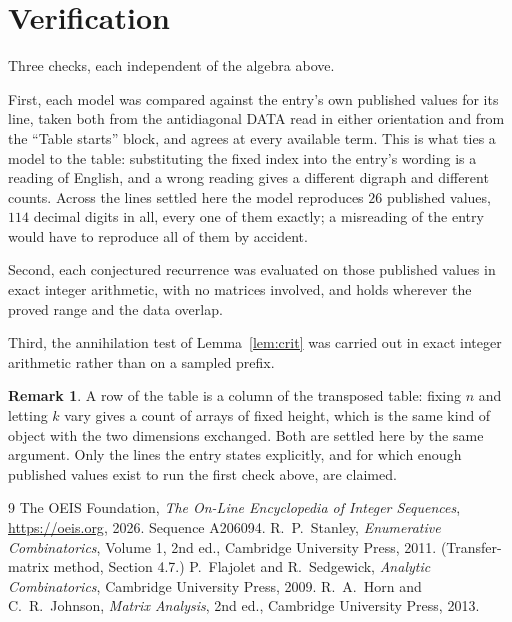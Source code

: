 \documentclass[11pt,a4paper]{article}
\theoremstyle{plain}
\theoremstyle{definition}
\newtheorem{remark}[theorem]{Remark}
\begin{document}
\section{Verification}

Three checks, each independent of the algebra above.

First, each model was compared against the entry's own published values for its line, taken
both from the antidiagonal DATA read in either orientation and from the ``Table starts''
block, and agrees at every available term. This is what ties a model to the table:
substituting the fixed index into the entry's wording is a reading of English, and a wrong
reading gives a different digraph and different counts. Across the lines settled here the
model reproduces $26$ published values, $114$ decimal digits in all, every one of
them exactly; a misreading of the entry would have to reproduce all of them by accident.

Second, each conjectured recurrence was evaluated on those published values in exact
integer arithmetic, with no matrices involved, and holds wherever the proved range and the
data overlap.

Third, the annihilation test of Lemma~\ref{lem:crit} was carried out in exact integer
arithmetic rather than on a sampled prefix.

\begin{remark}
A row of the table is a column of the transposed table: fixing $n$ and letting $k$ vary gives a
count of arrays of fixed height, which is the same kind of object with the two dimensions
exchanged. Both are settled here by the same argument. Only the lines the entry states
explicitly, and for which enough published values exist to run the first check above, are
claimed.
\end{remark}

\begin{thebibliography}{9}
 The OEIS Foundation, \emph{The On-Line Encyclopedia of Integer
Sequences}, \url{https://oeis.org}, 2026. Sequence A206094.
 R.~P.~Stanley, \emph{Enumerative Combinatorics}, Volume 1, 2nd ed.,
Cambridge University Press, 2011. (Transfer-matrix method, Section 4.7.)
 P.~Flajolet and R.~Sedgewick, \emph{Analytic Combinatorics}, Cambridge
University Press, 2009.
 R.~A.~Horn and C.~R.~Johnson, \emph{Matrix Analysis}, 2nd ed., Cambridge
University Press, 2013.
\end{thebibliography}
\end{document}
